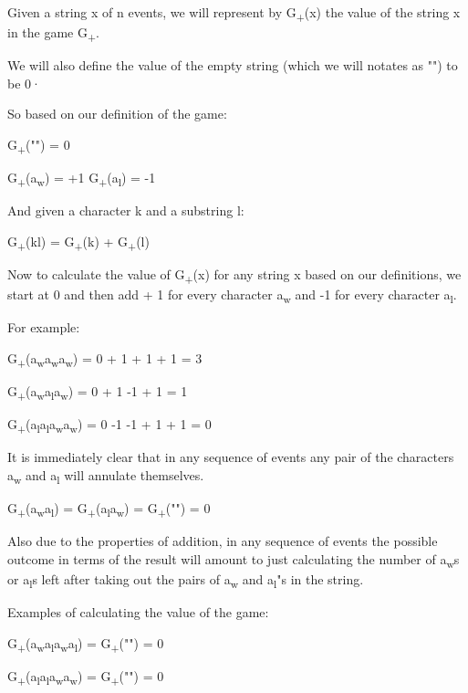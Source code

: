 \documentclass[12pt,reqno]{amsart}
\begin{document}
Given a string x of n events, we will represent by G\textsubscript{+}(x) the value of the string x in the game G\textsubscript{+}.

We will also define the value of the empty string (which we will notates as "") to be 0·

So based on our definition of the game:

G\textsubscript{+}("") = 0

G\textsubscript{+}(a\textsubscript{w}) = +1
G\textsubscript{+}(a\textsubscript{l}) = -1

And given a character k and a substring l:

G\textsubscript{+}(kl) = G\textsubscript{+}(k) + G\textsubscript{+}(l)

Now to calculate the value of G\textsubscript{+}(x) for any string x based on our definitions, we start at 0 and then add + 1 for every character a\textsubscript{w} and -1 for every character a\textsubscript{l}.

For example:

G\textsubscript{+}(a\textsubscript{w}a\textsubscript{w}a\textsubscript{w}) = 0 + 1 + 1 + 1 = 3

G\textsubscript{+}(a\textsubscript{w}a\textsubscript{l}a\textsubscript{w}) = 0 + 1 -1 + 1 = 1

G\textsubscript{+}(a\textsubscript{l}a\textsubscript{l}a\textsubscript{w}a\textsubscript{w}) = 0 -1 -1 + 1 + 1 = 0


It is immediately clear that in any sequence of events any pair of the characters a\textsubscript{w} and a\textsubscript{l} will annulate themselves. 

G\textsubscript{+}(a\textsubscript{w}a\textsubscript{l}) = G\textsubscript{+}(a\textsubscript{l}a\textsubscript{w}) = G\textsubscript{+}("") = 0


Also due to the properties of addition, in any sequence of events the possible outcome in terms of the result will amount to just calculating the number of a\textsubscript{w}s or a\textsubscript{l}s left after taking out the pairs of a\textsubscript{w} and a\textsubscript{l}"s in the string.

Examples of calculating the value of the game: 

G\textsubscript{+}(a\textsubscript{w}a\textsubscript{l}a\textsubscript{w}a\textsubscript{l}) = G\textsubscript{+}("") = 0

G\textsubscript{+}(a\textsubscript{l}a\textsubscript{l}a\textsubscript{w}a\textsubscript{w}) = G\textsubscript{+}("") = 0
\end{document}

